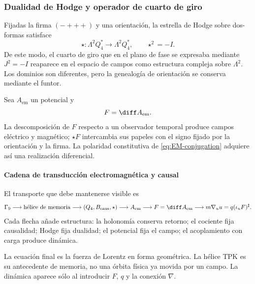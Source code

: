 \subsubsection{Dualidad de Hodge y operador de cuarto de giro}

Fijadas la firma \((-+++ )\) y una orientación, la estrella de Hodge sobre
dos-formas satisface
\begin{equation}
\star:\Lambda^2Q_4^*\to\Lambda^2Q_4^*,
\qquad \star^2=-I.
\label{eq:hodge-star}
\end{equation}
De este modo, el cuarto de giro que en el plano de fase se expresaba mediante
\(J^2=-I\) reaparece en el espacio de campos como estructura compleja sobre
\(\Lambda^2\). Los dominios son diferentes, pero la genealogía de orientación
se conserva mediante el funtor.

Sea \(A_{\mathrm{em}}\) un potencial y
\begin{equation}
F=\diff A_{\mathrm{em}}.
\label{eq:F-dA}
\end{equation}
La descomposición de \(F\) respecto a un observador temporal produce campos
eléctrico y magnético; \(\star F\) intercambia sus papeles con el signo fijado
por la orientación y la firma. La polaridad constitutiva de
\eqref{eq:EM-conjugation} adquiere así una realización diferencial.

\paragraph{Cadena de transducción electromagnética y causal}

El transporte que debe mantenerse visible es
\begin{equation}
\Gamma_9
\longrightarrow\text{hélice de memoria}
\longrightarrow(Q_4,B_{\mathrm{caus}},\star)
\longrightarrow A_{\mathrm{em}}
\longrightarrow F=\diff A_{\mathrm{em}}
\longrightarrow
m\nabla_u u=q(\iota_uF)^\sharp.
\label{eq:lorentz-chain}
\end{equation}
Cada flecha añade estructura: la holonomía conserva retorno; el cociente fija
causalidad; Hodge fija dualidad; el potencial fija el campo; el acoplamiento
con carga produce dinámica.

La ecuación final es la fuerza de Lorentz en forma geométrica. La hélice TPK
es su antecedente de memoria, no una órbita física ya movida por un campo. La
dinámica aparece sólo al introducir \(F\), \(q\) y la conexión \(\nabla\).


